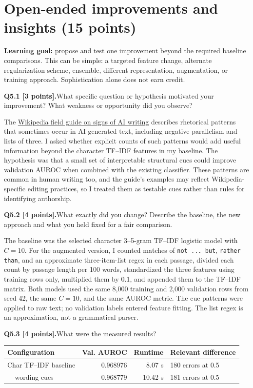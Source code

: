 \documentclass[11pt,letterpaper]{article}
\newcommand{\question}[2]{\needspace{4\baselineskip}\par\addvspace{0.45em}\noindent\textbf{#1}\quad #2\par\nobreak\vspace{0.1em}}
\begin{document}
\section{Open-ended improvements and insights (15 points)}
\textbf{Learning goal:} propose and test one improvement beyond the required baseline comparisons. This can be simple: a targeted feature change, alternate regularization scheme, ensemble, different representation, augmentation, or training approach. Sophistication alone does not earn credit.

\question{Q5.1 [3 points].}{What specific question or hypothesis motivated your improvement? What weakness or opportunity did you observe?}
The \href{https://en.wikipedia.org/wiki/Wikipedia:Signs_of_AI_writing}{Wikipedia field guide on signs of AI writing} describes rhetorical patterns that sometimes occur in AI-generated text, including negative parallelism and lists of three. I asked whether explicit counts of such patterns would add useful information beyond the character TF--IDF features in my baseline. The hypothesis was that a small set of interpretable structural cues could improve validation AUROC when combined with the existing classifier. These patterns are common in human writing too, and the guide's examples may reflect Wikipedia-specific editing practices, so I treated them as testable cues rather than rules for identifying authorship.
\question{Q5.2 [4 points].}{What exactly did you change? Describe the baseline, the new approach and what you held fixed for a fair comparison.}
The baseline was the selected character 3--5-gram TF--IDF logistic model with $C=10$. For the augmented version, I counted matches of \texttt{not ... but}, \texttt{rather than}, and an approximate three-item-list regex in each passage, divided each count by passage length per 100 words, standardized the three features using training rows only, multiplied them by 0.1, and appended them to the TF--IDF matrix. Both models used the same 8,000 training and 2,000 validation rows from seed 42, the same $C=10$, and the same AUROC metric. The cue patterns were applied to raw text; no validation labels entered feature fitting. The list regex is an approximation, not a grammatical parser.
\question{Q5.3 [4 points].}{What were the measured results?}
\begin{tabularx}{\linewidth}{@{}YrrY@{}}\toprule Configuration & Val. AUROC & Runtime & Relevant difference \\ \midrule Char TF--IDF baseline & 0.968976 & 8.07 s & 180 errors at 0.5 \\ + wording cues & 0.968779 & 10.42 s & 181 errors at 0.5 \\ \bottomrule\end{tabularx}
\end{document}
